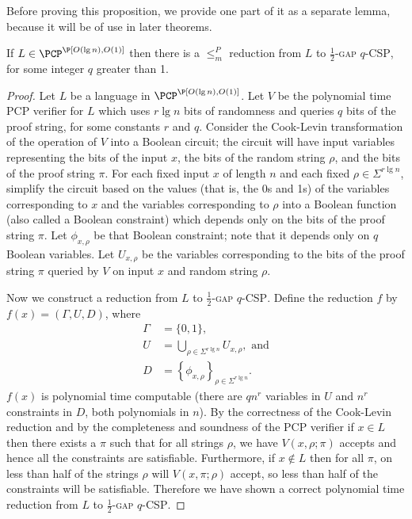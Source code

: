 \documentclass{article}
\begin{document}
Before proving this proposition, we provide one part of it as a separate lemma, because it will be of use in later theorems.

\begin{lemma}\label{lem:constraintsp}
  If $L \in \PCP^\P[O(\lg n), O(1)]$ then there is a $\leq_m^P$ reduction from $L$ to \textsc{$\frac{1}{2}$-gap $q$-CSP}, for some integer $q$ greater than 1.
\end{lemma}
\begin{proof}
  Let $L$ be a language in $\PCP^\P[O(\lg n), O(1)]$.
  Let $V$ be the polynomial time PCP verifier for $L$ which uses $r \lg n$ bits of randomness and queries $q$ bits of the proof string, for some constants $r$ and $q$.
  Consider the Cook-Levin transformation of the operation of $V$ into a Boolean circuit; the circuit will have input variables representing the bits of the input $x$, the bits of the random string $\rho$, and the bits of the proof string $\pi$.
  For each fixed input $x$ of length $n$ and each fixed $\rho \in \Sigma^{r \lg n}$, simplify the circuit based on the values (that is, the 0s and 1s) of the variables corresponding to $x$ and the variables corresponding to $\rho$ into a Boolean function (also called a Boolean constraint) which depends only on the bits of the proof string $\pi$.
  Let $\phi_{x, \rho}$ be that Boolean constraint; note that it depends only on $q$ Boolean variables.
  Let $U_{x, \rho}$ be the variables corresponding to the bits of the proof string $\pi$ queried by $V$ on input $x$ and random string $\rho$.

  Now we construct a reduction from $L$ to \textsc{$\frac{1}{2}$-gap $q$-CSP}.
  Define the reduction $f$ by $f(x) = (\Gamma, U, D)$, where
  \begin{align*}
    \Gamma & = \{0, 1\}, \\
    U & = \bigcup_{\rho \in \Sigma^{r \lg n}}{U_{x, \rho}}, \text{ and} \\
    D & = \left\{\phi_{x, \rho}\right\}_{\rho \in \Sigma^{r \lg n}}.
  \end{align*}
  $f(x)$ is polynomial time computable (there are $qn^r$ variables in $U$ and $n^r$ constraints in $D$, both polynomials in $n$).
  By the correctness of the Cook-Levin reduction and by the completeness and soundness of the PCP verifier if $x \in L$ then there exists a $\pi$ such that for all strings $\rho$, we have $V(x, \rho; \pi)$ accepts and hence all the constraints are satisfiable.
  Furthermore, if $x \notin L$ then for all $\pi$, on less than half of the strings $\rho$ will $V(x, \pi; \rho)$ accept, so less than half of the constraints will be satisfiable.
  Therefore we have shown a correct polynomial time reduction from $L$ to \textsc{$\frac{1}{2}$-gap $q$-CSP}.
\end{proof}
\end{document}
